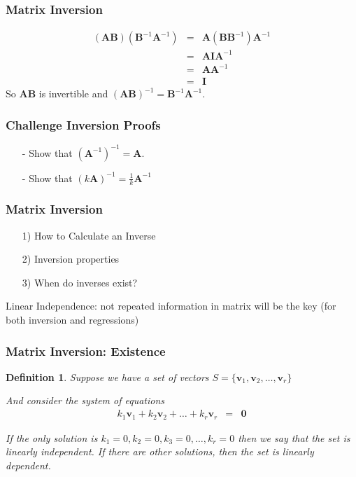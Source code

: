 \documentclass{beamer}
\newtheorem{defn}{Definition}
\numberwithin{equation}{section}
\begin{document}
\begin{frame}
\frametitle{Matrix Inversion}

\begin{eqnarray}
(\boldsymbol{A} \boldsymbol{B})(\boldsymbol{B}^{-1} \boldsymbol{A}^{-1}) & = & \boldsymbol{A} (\boldsymbol{B}\boldsymbol{B}^{-1})  \boldsymbol{A}^{-1} \nonumber \\
& = & \boldsymbol{A} \boldsymbol{I} \boldsymbol{A}^{-1} \nonumber \\
& = & \boldsymbol{A} \boldsymbol{A}^{-1} \nonumber \\
& = & \boldsymbol{I} \nonumber 
\end{eqnarray}
So $\boldsymbol{A}\boldsymbol{B} $ is invertible and $(\boldsymbol{A}\boldsymbol{B} )^{-1}   = \boldsymbol{B}^{-1} \boldsymbol{A}^{-1} $.

\end{frame}

\begin{frame}
\frametitle{Challenge Inversion Proofs}

\begin{itemize}
\item[-] Show that $(\boldsymbol{A}^{-1})^{-1}  = \boldsymbol{A}$.  
\item[-] Show that $(k \boldsymbol{A})^{-1} = \frac{1}{k} \boldsymbol{A}^{-1}$
\end{itemize}

\end{frame}


\begin{frame}
\frametitle{Matrix Inversion}
\begin{itemize}
\item[1)] How to Calculate an Inverse
\item[2)] Inversion properties
\item[3)] \alert{When do inverses exist? }
\end{itemize}


\alert{Linear Independence}: not repeated information in matrix will be the key (for both inversion and regressions)

\end{frame}

\begin{frame}
\frametitle{Matrix Inversion: Existence}


\begin{defn} Suppose we have a set of vectors $S =\{ \boldsymbol{v}_{1}, \boldsymbol{v}_{2}, \hdots, \boldsymbol{v}_{r}\}$ 

And consider the system of equations 
\begin{eqnarray}
k_{1} \boldsymbol{v}_{1} + k_{2} \boldsymbol{v}_{2} + \hdots + k_{r} \boldsymbol{v}_{r} & = & \boldsymbol{0} \nonumber 
\end{eqnarray}

If the only solution is $k_{1} = 0, k_{2} = 0, k_{3} = 0, \hdots, k_{r} = 0$ then we say that the set is \alert{linearly independent}.  If there are other solutions, then the set is \alert{linearly dependent}.

\end{defn}

\end{frame}
\end{document}
